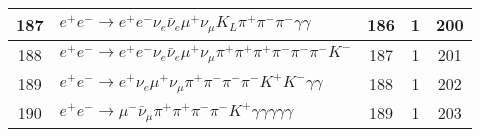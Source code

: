 \documentclass[landscape]{article}
\begin{document}
\begin{table}[htbp!]
\begin{tabular}{|c|>{\centering}p{18cm}|c|c|c|}
\hline
187 & $ e^{+} e^{-} \rightarrow e^{+} e^{-} \nu_{e} \bar{\nu}_{e} \mu^{+} \nu_{\mu} K_{L} \pi^{+} \pi^{-} \pi^{-} \gamma \gamma $ & 186 & 1 & 200 \\
\hline
188 & $ e^{+} e^{-} \rightarrow e^{+} e^{-} \nu_{e} \bar{\nu}_{e} \mu^{+} \nu_{\mu} \pi^{+} \pi^{+} \pi^{+} \pi^{-} \pi^{-} \pi^{-} K^{-} $ & 187 & 1 & 201 \\
\hline
189 & $ e^{+} e^{-} \rightarrow e^{+} \nu_{e} \mu^{+} \nu_{\mu} \pi^{+} \pi^{-} \pi^{-} \pi^{-} K^{+} K^{-} \gamma \gamma $ & 188 & 1 & 202 \\
\hline
190 & $ e^{+} e^{-} \rightarrow \mu^{-} \bar{\nu}_{\mu} \pi^{+} \pi^{+} \pi^{-} \pi^{-} K^{+} \gamma \gamma \gamma \gamma \gamma $ & 189 & 1 & 203 \\
\hline
\end{tabular}
\end{table}
\end{document}
